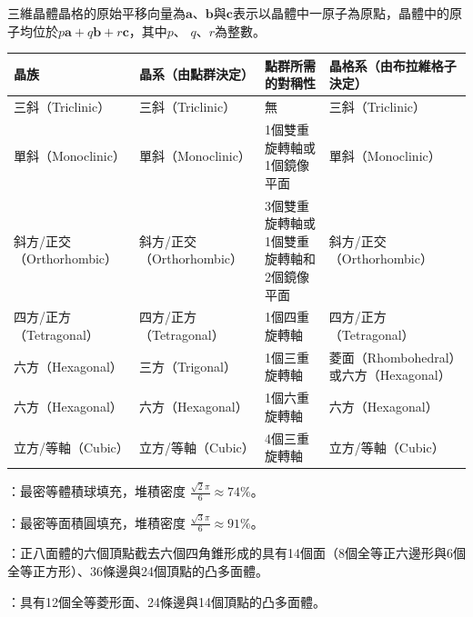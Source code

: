 \documentclass[a4paper,12pt]{article}
\begin{document}
三維晶體晶格的原始平移向量為$\mathbf {a}$、$\mathbf{b}$與$\mathbf {c}$表示以晶體中一原子為原點，晶體中的原子均位於$p\mathbf {a} +q\mathbf {b} +r\mathbf {c} $，其中$p$、 $q$、$r$為整數。
\begin{longtable}[c]{|p{0.2\tw}|p{0.2\tw}|p{0.2\tw}|p{0.2\tw}|}
    \hline
        晶族 & 晶系（由點群決定） & 點群所需的對稱性 & 晶格系（由布拉維格子決定） \\ \hline\endhead
        三斜（Triclinic） & 三斜（Triclinic） & 無 & 三斜（Triclinic） \\ \hline
        單斜（Monoclinic） & 單斜（Monoclinic） & 1個雙重旋轉軸或1個鏡像平面 & 單斜（Monoclinic） \\ \hline
        斜方/正交（Orthorhombic） & 斜方/正交（Orthorhombic） & 3個雙重旋轉軸或1個雙重旋轉軸和2個鏡像平面 & 斜方/正交（Orthorhombic） \\ \hline
        四方/正方（Tetragonal） & 四方/正方（Tetragonal） & 1個四重旋轉軸 & 四方/正方（Tetragonal） \\ \hline
        六方（Hexagonal） & 三方（Trigonal） & 1個三重旋轉軸 & 菱面（Rhombohedral）或六方（Hexagonal） \\ \hline
        六方（Hexagonal） & 六方（Hexagonal） & 1個六重旋轉軸 & 六方（Hexagonal） \\ \hline
        立方/等軸（Cubic） & 立方/等軸（Cubic） & 4個三重旋轉軸 & 立方/等軸（Cubic） \\ \hline
    \end{longtable}\FB
{}
\bit
\item {}：最密等體積球填充，堆積密度 $\frac{\sqrt{2}\pi}{6}\approx 74\%$。
\item {}：最密等面積圓填充，堆積密度 $\frac{\sqrt{3}\pi}{6}\approx 91\%$。
\item {}：正八面體的六個頂點截去六個四角錐形成的具有14個面（8個全等正六邊形與6個全等正方形）、36條邊與24個頂點的凸多面體。
\item {}：具有12個全等菱形面、24條邊與14個頂點的凸多面體。
\eit
{}
\end{document}
